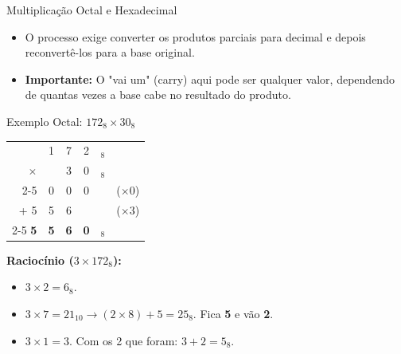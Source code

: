 \begin{frame}{Multiplicação Octal e Hexadecimal}
    \begin{itemize}
        \item O processo exige converter os produtos parciais para decimal e depois reconvertê-los para a base original.
        \item \textbf{Importante:} O "vai um" (carry) aqui pode ser qualquer valor, dependendo de quantas vezes a base cabe no resultado do produto.
    \end{itemize}

    \begin{exampleblock}{Exemplo Octal: $172_8 \times 30_8$}
        \centering
        \begin{tabular}{r ccccl}
                       & 1          & 7          & 2          & $_8$          &              \\
            $\times$   &            & 3          & 0          & $_8$          &              \\ \cline{2-5}
                       & 0          & 0          & 0          &               & ($\times 0$) \\
            + 5        & 5          & 6          &            &               & ($\times 3$) \\ \cline{2-5}
            \textbf{5} & \textbf{5} & \textbf{6} & \textbf{0} & \textbf{$_8$} &              \\
        \end{tabular}
    \end{exampleblock}

    \small
    \textbf{Raciocínio ($3 \times 172_8$):}
    \begin{itemize}
        \item $3 \times 2 = 6_8$.
        \item $3 \times 7 = 21_{10} \rightarrow (2 \times 8) + 5 = 25_8$. Fica \textbf{5} e vão \textbf{2}.
        \item $3 \times 1 = 3$. Com os 2 que foram: $3 + 2 = 5_8$.
    \end{itemize}
\end{frame}

